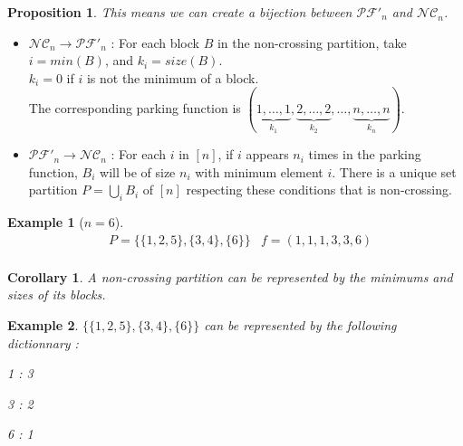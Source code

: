 \documentclass[12pt]{report}
\newtheorem*{prop}{Proposition}
\newtheorem*{example}{Example}
\newtheorem*{cor}{Corollary}
\begin{document}
\begin{prop}
    This means we can create a \emph{bijection} between
    $\mathcal{PF'}_n$ and $\mathcal{NC}_n$.
\end{prop}

\begin{itemize}
    \item $\mathcal{NC}_n \to \mathcal{PF'}_n$ :
    For each block $B$ in the non-crossing partition, take
    $i = min (B)$, and $k_i = size (B)$.\\
    $k_i = 0$ if $i$ is not the minimum of a block.\\
    The corresponding parking function is
    $(\underbrace{1, \ldots, 1}_{k_1}, \underbrace{2, \ldots,
    2}_{k_2}, \ldots, \underbrace{n, \ldots, n}_{k_n})$.\\
    \item $\mathcal{PF'}_n \to \mathcal{NC}_n$ :
    For each $i$ in $[n]$, if $i$ appears $n_i$ times in the
    parking function, $B_i$ will be of size $n_i$ with minimum
    element $i$.
    There is a unique set partition $\displaystyle P = \bigcup_{i}{B_i}$
    of $[n]$ respecting these conditions that is non-crossing.
\end{itemize}

\begin{example}[$n = 6$]
    \begin{align*}
        &P = \{\{1, 2, 5\}, \{3, 4\}, \{6\}\}
        &f = (1, 1, 1, 3, 3, 6)\\
    \end{align*}
\end{example}

\begin{cor}
    A non-crossing partition can be represented by the minimums
    and sizes of its blocks.
\end{cor}

\begin{example}
    $\{\{1, 2, 5\}, \{3, 4\}, \{6\}\}$ can be represented by
    the following dictionnary :\\
    \begin{itemize*}
        \item 1 : 3\\
        \item 3 : 2\\
        \item 6 : 1\\
    \end{itemize*}
\end{example}
\end{document}
